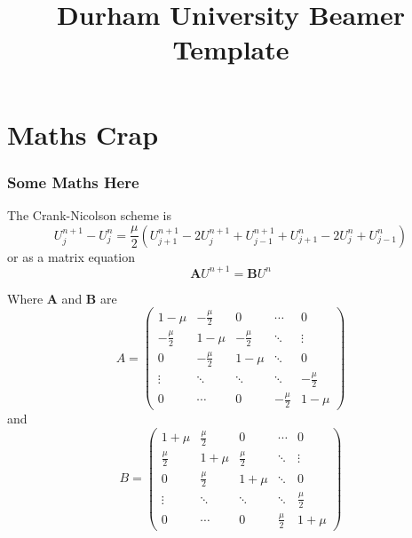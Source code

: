 \documentclass[xcolor=dvipsnames,usepdftitle=false]{beamer}
\begin{document}
\title{Durham University Beamer Template}
\author{}
\date{}

\begin{frame}[plane]

\titlepage

\end{frame}

\section{Maths Crap}

\begin{frame}

\frametitle{Some Maths Here}

The Crank-Nicolson scheme is
\begin{equation} \label{crank}
	U^{n+1}_{j} - U^{n}_{j} = \frac{\mu}{2} \left(U^{n+1}_{j+1} - 2U^{n+1}_j + U^{n+1}_{j-1} + U^n_{j+1} - 2U^n_j + U^{n}_{j-1}\right)
\end{equation}
or as a matrix equation
\begin{equation}
	\mathbf{A} U^{n+1} = \mathbf{B} U^n
\end{equation}
\end{frame}
\begin{frame}
Where $\mathbf{A}$ and $\mathbf{B}$ are
\[
A =\begin{pmatrix}
1-\mu & - \frac{\mu}{2} & 0 & \cdots & 0 \\
- \frac{\mu}{2} & 1-\mu & - \frac{\mu}{2} & \ddots & \vdots \\
0 & -\frac{\mu}{2} & 1-\mu & \ddots & 0 \\
\vdots & \ddots & \ddots & \ddots & -\frac{\mu}{2} \\
0 & \cdots & 0 & - \frac{\mu}{2} & 1-\mu
\end{pmatrix}
\]
and
\[
B =\begin{pmatrix}
1+\mu & \frac{\mu}{2} & 0 & \cdots & 0 \\
\frac{\mu}{2} & 1+\mu & \frac{\mu}{2} & \ddots & \vdots \\
0 & \frac{\mu}{2} & 1+\mu & \ddots & 0 \\
\vdots & \ddots & \ddots & \ddots & \frac{\mu}{2} \\
0 & \cdots & 0 & \frac{\mu}{2} & 1+\mu
\end{pmatrix}
\]

\end{frame}
\end{document}
